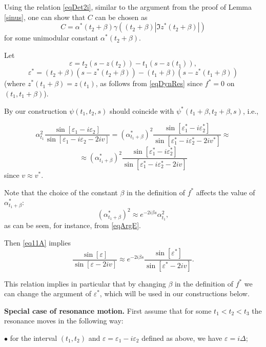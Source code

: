 \documentclass[11pt,twoside,reqno]{amsart}
\def\to{\rightarrow}
\def\DD{{\mathcal{D}}}
\def\e{\varepsilon}
\def\DD{\Delta}
\def\g{\gamma}
\def\a{\alpha}
\def\b{\beta}
\theoremstyle{plain}
\numberwithin{equation}{section}
\begin{document}
Using the relation \eqref{eqDet2i}, similar to the argument from the proof of Lemma \ref{sinus}, one can show that $C$ can be chosen as 
$$C=\alpha^*(t_2+\b)\g((t_2+\b)|\Im z^*(t_2+\b)|)
$$
for some unimodular constant $\alpha^*(t_2+\b)$.

Let $$\e=t_2(s-z(t_2))-t_1(s-z(t_1)),$$$$
  \e^*=(t_2+\b)(s-z^*(t_2+\b))-(t_1+\b)(s-z^*(t_1+\b))$$ 
 (where $z^*(t_1+\b)=z(t_1)$, as follows from \eqref{eqDynRes} since $f^*=0$ on $(t_1,t_1+\b)$).

By our construction $\psi(t_1,t_2,s)$ should coincide with $\psi^*(t_1+\beta,t_2+\beta,s)$, i.e., 

$$\a_{t_1}^2\frac{\sin[\e_1   -i\e_2]}{\sin[\e_1 -i\e_2  - 2iv] }=(\a^*_{t_1+\beta })^2\frac{\sin[\e^*_1   -i\e^*_2]}{\sin[\e^*_1  -i\e^*_2 - 2iv^*] }\approx$$\begin{equation}\approx (\a^*_{t_1+\beta })^2\frac{\sin[\e^*_1   -i\e^*_2]}{\sin[\e^*_1  -i\e^*_2 - 2iv] }
\label{eq11A}\end{equation}
since $v\approx v^*$. 


Note that the choice of the constant $\beta$ in the definition of $f^*$ affects the value of $\a^*_{t_1+\beta }$: 
$$(\a^*_{t_1+\beta })^2\approx e^{-2i\beta s}\a_{t_1}^2,$$ 
as can be seen, for instance, from \eqref{eqArgE}. 


Then   \eqref{eq11A}  implies
\begin{equation}\frac{\sin[\e]}{\sin[\e   - 2iv] }\approx e^{-2i\beta s}\frac{\sin[\e^{*}]}{\sin[\e^{*}   - 2iv] }.
	\label{eq11B}\end{equation}
	
	This relation implies in particular that by changing $\b$ in the definition of $f^*$ we can change the argument of $\e^*$, which will be used in our constructions below.


{\bf Special case of resonance motion.}
First assume that for some $t_1<t_2<t_3$ the resonance moves in the following way: 

$\bullet$ for the interval $(t_1,t_2)$ and $\e=\e_1-i\e_2$ defined as above, we have $\e=i\DD$;
\end{document}
